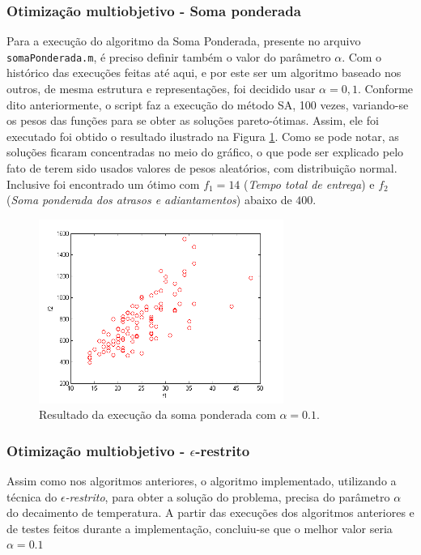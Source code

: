 \documentclass[conference]{IEEEtran}
\begin{document}
\subsubsection{Otimização multiobjetivo - Soma ponderada}
Para a execução do algoritmo da Soma Ponderada, presente no arquivo \texttt{somaPonderada.m}, é preciso definir também o valor do parâmetro $\alpha$. Com o histórico das execuções feitas até aqui, e por este ser um algoritmo baseado nos outros, de mesma estrutura e representações, foi decidido usar $\alpha = 0,1$. Conforme dito anteriormente, o script faz a execução do método SA, 100 vezes, variando-se os pesos das funções para se obter as soluções pareto-ótimas. Assim, ele foi executado foi obtido o resultado ilustrado na Figura \ref{fig:result-sp}. Como se pode notar, as soluções ficaram concentradas no meio do gráfico, o que pode ser explicado pelo fato de terem sido usados valores de pesos aleatórios, com distribuição normal. Inclusive foi encontrado um ótimo com $f_1 = 14$ (\emph{Tempo total de entrega}) e $f_2$ (\emph{Soma ponderada dos atrasos e adiantamentos}) abaixo de $400$.

	\begin{figure}[h]
		\centering
		\includegraphics[width=8cm]{img/result-sp.png}
		\caption{Resultado da execução da soma ponderada com $\alpha = 0.1$.}
		\label{fig:result-sp}
	\end{figure}


\subsubsection{Otimização multiobjetivo - $\epsilon$-restrito}
Assim como nos algoritmos anteriores, o algoritmo implementado, utilizando a técnica do \emph{$\epsilon$-restrito}, para obter a solução do problema, precisa do parâmetro $\alpha$ do decaimento de temperatura. A partir das execuções dos algoritmos anteriores e de testes feitos durante a implementação, concluiu-se que o melhor valor seria $\alpha = 0.1$
\end{document}
